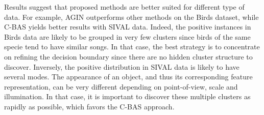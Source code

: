 \documentclass{article}
\begin{document}
Results suggest that proposed methods are better suited for different type of data. For example, AGIN outperforms other methods on the Birds dataset, while C-BAS yields better results with SIVAL data. Indeed, the positive instances in Birds data are likely to be grouped in very few clusters since birds of the same specie tend to have similar songs. In that case, the best strategy is to concentrate on refining the decision boundary since there are no hidden cluster structure to discover. Inversely, the positive distribution in SIVAL data is likely to have several modes. The appearance of an object, and thus its corresponding feature representation, can be very different depending on point-of-view, scale and illumination. In that case, it is important to discover these multiple clusters as rapidly as possible, which favors the C-BAS approach. 


\begin{table*}[!ht]
\caption{Number of wins for each algorithm on each corpus. The NAULC for 100 runs were averaged and a t-test was performed to determine the best algorithm ($\alpha = 0.05$).} 
\centering
{}
\label{Table:Training}
\end{table*}
\end{document}
